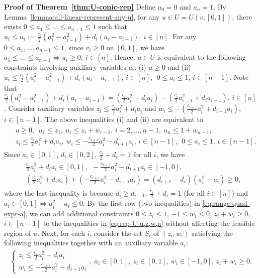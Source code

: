 	\smallskip\noindent\textbf{Proof of Theorem~\ref{thm:U-conic-rep}}
		Define $a_0 = 0$ and $a_n = 1$. By Lemma~\ref{lemma:all-linear-represent-any-u}, for any $u\in U = U(v, [0,1])$, there exists $0\leq a_1 \leq \dots \leq a_{n-1}\leq 1$ such that 
		$u_i \leq \bar{u}_i := \frac{c_i}{2}(a_i^2 - a_{i-1}^2) + d_i (a_i - a_{i-1}),\ i\in [n]$. 
	For any $0\leq a_1, \dots, a_{n-1}\leq 1$, since $v_i \geq 0$ on $[0,1]$, we have 
	$ a_1 \leq \dots \leq a_{n-1} \Leftrightarrow \bar{u}_i \geq 0, \ i\in [n]$.
	Hence, $u\in U$ is equivalent to the following constraints involving auxiliary variables $a_i$: (i) $ u\geq 0$ and (ii) $u_i \leq \frac{c_i}{2}(a_i^2 - a_{i-1}^2) + d_i (a_i - a_{i-1}),\, i\in [n],\ \
		 0 \leq a_i \leq 1,\, i\in [n-1]$. 
	Note that $\frac{c_i}{2}(a_i^2 - a_{i-1}^2) + d_i(a_i - a_{i-1}) = \left(\frac{c_i}{2}a_i^2 + d_i a_i\right) - \left(\frac{c_i}{2}a_{i-1}^2 + d_i a_{i-1}\right),\, i\in [n]$.
	Consider auxiliary variables $z_i\leq \frac{c_i}{2}a_i^2 + d_i a_i$ and $w_i \leq - (\frac{c_{i+1}}{2}a_i^2 + d_{i+1} a_i)$, $i\in [n-1]$. The above inequalities (i) and (ii) are equivalent to 
	\begin{align}
		\begin{split}
			& u\geq 0, \ \ u_1 \leq z_1, \  u_i \leq z_i + w_{i-1},\, i=2, \dots, n-1, \  u_n \leq 1+w_{n-1},\\
			& z_i \leq \frac{c_i}{2} a_i^2 + d_i a_i,\ w_i \leq -\frac{c_{i+1}}{2} a_i^2 - d_{i+1}a_i, \, i \in [n-1], \ \ 0\leq a_i \leq 1,\, i\in [n-1]. 
		\end{split}\label{eq:rep-U-u,z,w,a}
	\end{align}
	Since $a_i \in [0,1]$, $d_i \in [0,2]$, $\frac{c_i}{2} + d_i = 1$ for all $i$, we have
	\begin{align}
		\begin{split}
			& \frac{c_i}{2}a_i^2 + d_i a_i \in [0,1],\ \ -\frac{c_{i+1}}{2}a_i^2 - d_{i+1} a_i \in [-1,0],\\
			& \left(\frac{c_i}{2}a_i^2 + d_i a_i \right) + \left(-\frac{c_{i+1}}{2}a_i^2 - d_{i+1} a_i\right) = (d_{i+1} - d_i)(a_i^2 - a_i) \geq 0, 
		\end{split} \label{eq:range-quad-expr-a}
	\end{align}
	where the last inequality is because $d_i \geq d_{i+1}$, $\frac{c_i}{2} + d_i = 1$ (for all $i\in [n]$) and $a_i \in [0,1] \Rightarrow a_i^2 - a_i \leq 0$.
	By the first row (two inequalities) in \eqref{eq:range-quad-expr-a}, we can add additional constraints 
	$0\leq z_i \leq 1$, $-1 \leq w_i\leq 0$, $z_i + w_i \geq 0$, $i\in [n-1]$
	to the inequalities in \eqref{eq:rep-U-u,z,w,a} without affecting the feasible region of $u$. 
	Next, for each $i$, consider the set $S_i$ of $(z_i, w_i)$ satisfying the following inequalities together with an auxiliary variable $a_i$:
	\begin{align}
		\begin{cases}
			z_i \leq \frac{c_i}{2}a_i^2 + d_i a_i \\
			w_i \leq - \frac{c_{i+1}}{2} a_i^2 - d_{i+1} a_i
		\end{cases}
		,\  a_i \in [0,1], \ z_i \in [0,1], \, w_i\in [-1,0],\, z_i + w_i \geq 0. \label{eq:zi-wi-ai-zi+wi>=0}
	\end{align}
	
